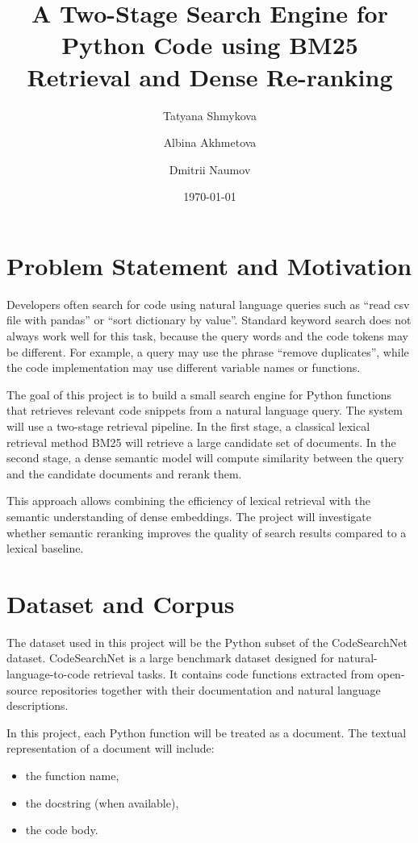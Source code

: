 \documentclass[11pt,a4paper]{article}
\title{A Two-Stage Search Engine for Python Code using BM25 Retrieval and Dense Re-ranking}
\author{Tatyana Shmykova \and Albina Akhmetova \and Dmitrii Naumov}
\date{\today}
\begin{document}
\maketitle

\section{Problem Statement and Motivation}

Developers often search for code using natural language queries such as ``read csv file with pandas'' or ``sort dictionary by value''. Standard keyword search does not always work well for this task, because the query words and the code tokens may be different. For example, a query may use the phrase ``remove duplicates'', while the code implementation may use different variable names or functions.

The goal of this project is to build a small search engine for Python functions that retrieves relevant code snippets from a natural language query. The system will use a two-stage retrieval pipeline. In the first stage, a classical lexical retrieval method BM25 will retrieve a large candidate set of documents. In the second stage, a dense semantic model will compute similarity between the query and the candidate documents and rerank them.

This approach allows combining the efficiency of lexical retrieval with the semantic understanding of dense embeddings. The project will investigate whether semantic reranking improves the quality of search results compared to a lexical baseline.

\section{Dataset and Corpus}

The dataset used in this project will be the Python subset of the CodeSearchNet dataset. CodeSearchNet is a large benchmark dataset designed for natural-language-to-code retrieval tasks. It contains code functions extracted from open-source repositories together with their documentation and natural language descriptions.

In this project, each Python function will be treated as a document. The textual representation of a document will include:
\begin{itemize}
    \item the function name,
    \item the docstring (when available),
    \item the code body.
\end{itemize}
\end{document}
